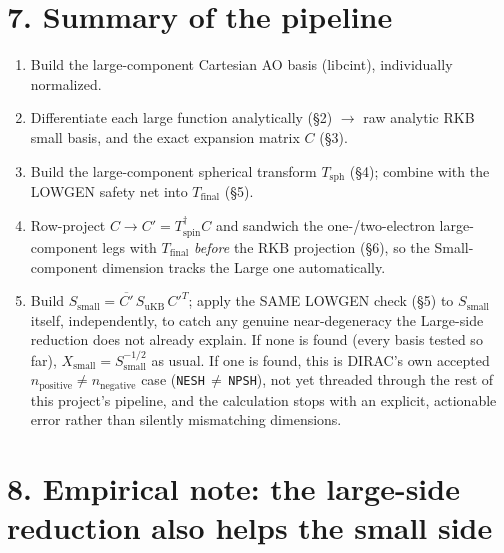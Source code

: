 \documentclass[11pt]{article}
\begin{document}
\section*{7. Summary of the pipeline}

\begin{enumerate}
\item Build the large-component Cartesian AO basis (libcint), individually normalized.
\item Differentiate each large function analytically (\S2) $\to$ raw analytic RKB small basis,
      and the exact expansion matrix $C$ (\S3).
\item Build the large-component spherical transform $T_{\text{sph}}$ (\S4); combine with the
      LOWGEN safety net into $T_{\text{final}}$ (\S5).
\item Row-project $C\to C'=T_{\text{spin}}^{\dagger}C$ and sandwich the one-/two-electron
      large-component legs with $T_{\text{final}}$ \emph{before} the RKB projection (\S6), so the
      Small-component dimension tracks the Large one automatically.
\item Build $S_{\text{small}}=\overline{C'}\,S_{\text{uKB}}\,C'^{T}$; apply the SAME LOWGEN check
      (\S5) to $S_{\text{small}}$ itself, independently, to catch any genuine near-degeneracy the
      Large-side reduction does not already explain. If none is found (every basis tested so far),
      $X_{\text{small}}=S_{\text{small}}^{-1/2}$ as usual. If one is found, this is DIRAC's own
      accepted $n_{\text{positive}}\ne n_{\text{negative}}$ case (\texttt{NESH}$\,\ne\,$\texttt{NPSH}),
      not yet threaded through the rest of this project's pipeline, and the calculation stops with
      an explicit, actionable error rather than silently mismatching dimensions.
\end{enumerate}

\section*{8. Empirical note: the large-side reduction also helps the small side}
\end{document}
